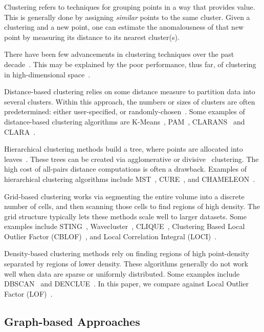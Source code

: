 Clustering refers to techniques for grouping points in a way that provides value.
This is generally done by assigning \textit{similar} points to the same cluster.
Given a clustering and a new point, one can estimate the anomalousness of that new point by measuring its distance to its nearest cluster(s).

There have been few advancements in clustering techniques over the past decade~\cite{wang2019progress}.
This may be explained by the poor performance, thus far, of clustering in high-dimensional space~\cite{zhang2013advancements}.

Distance-based clustering relies on some distance measure to partition data into several clusters.
Within this approach, the numbers or sizes of clusters are often predetermined: either user-specified, or randomly-chosen~\cite{wang2019progress}.
Some examples of distance-based clustering algorithms are
K-Means~\cite{macqueen1967some},
PAM~\cite{kaufman2009finding},
CLARANS~\cite{ng1994efficient} and
CLARA~\cite{kaufman2009finding}.

Hierarchical clustering methods build a tree, where points are allocated into leaves~\cite{wang2019progress}.
These trees can be created via agglomerative or divisive~\cite{agrawal1998automatic} clustering.
The high cost of all-pairs distance computations is often a drawback.
Examples of hierarchical clustering algorithms include
MST~\cite{zahn1971graph},
CURE~\cite{guha1998cure}, and
CHAMELEON~\cite{karypis1999hierarchical}.

Grid-based clustering works via segmenting the entire volume into a discrete number of cells, and then scanning those cells to find regions of high density.
The grid structure typically lets these methods scale well to larger datasets.
Some examples include
STING~\cite{wang1997sting},
Wavecluster~\cite{sheikholeslami2000wavecluster},
CLIQUE~\cite{agrawal1998automatic},
Clustering Based Local Outlier Factor (CBLOF)~\cite{he2003cblof}, and
Local Correlation Integral (LOCI)~\cite{papadimitriou2003loci}.

Density-based clustering methods rely on finding regions of high point-density separated by regions of lower density.
These algorithms generally do not work well when data are sparse or uniformly distributed.
Some examples include
DBSCAN~\cite{ester1996density} and
DENCLUE~\cite{hinneburg1998efficient}.
In this paper, we compare against Local Outlier Factor (LOF)~\cite{breunig2000lof}.


\subsection{Graph-based Approaches}
\label{subsec:introduction:graph-based-approaches}

